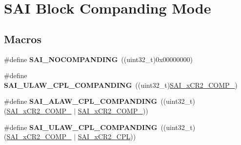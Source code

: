 \hypertarget{group___s_a_i___block___companding___mode}{}\section{S\+AI Block Companding Mode}
\label{group___s_a_i___block___companding___mode}
\subsection*{Macros}
\begin{DoxyCompactItemize}
\item 
\#define {\bfseries S\+A\+I\+\_\+\+N\+O\+C\+O\+M\+P\+A\+N\+D\+I\+NG}~((uint32\+\_\+t)0x00000000)\hypertarget{group___s_a_i___block___companding___mode_ga3c68168cebaf9498e3a46c3d68b7407d}{}\label{group___s_a_i___block___companding___mode_ga3c68168cebaf9498e3a46c3d68b7407d}

\item 
\#define {\bfseries S\+A\+I\+\_\+\+U\+L\+A\+W\+\_\+C\+P\+L\+\_\+\+C\+O\+M\+P\+A\+N\+D\+I\+NG}~((uint32\+\_\+t)\hyperlink{group___peripheral___registers___bits___definition_ga07d441ea4c041f91e4879a5b32278128}{S\+A\+I\+\_\+x\+C\+R2\+\_\+\+C\+O\+M\+P\+\_})\hypertarget{group___s_a_i___block___companding___mode_ga34b57f1a84cea0882f4af819cb160675}{}\label{group___s_a_i___block___companding___mode_ga34b57f1a84cea0882f4af819cb160675}

\item 
\#define {\bfseries S\+A\+I\+\_\+\+A\+L\+A\+W\+\_\+C\+P\+L\+\_\+\+C\+O\+M\+P\+A\+N\+D\+I\+NG}~((uint32\+\_\+t)(\hyperlink{group___peripheral___registers___bits___definition_ga07d441ea4c041f91e4879a5b32278128}{S\+A\+I\+\_\+x\+C\+R2\+\_\+\+C\+O\+M\+P\+\_} $\vert$ \hyperlink{group___peripheral___registers___bits___definition_ga4e73ed73e3404aa41ae0edad8af036f8}{S\+A\+I\+\_\+x\+C\+R2\+\_\+\+C\+O\+M\+P\+\_}))\hypertarget{group___s_a_i___block___companding___mode_gadd2d22be92ae572c749d709c14e7e4c1}{}\label{group___s_a_i___block___companding___mode_gadd2d22be92ae572c749d709c14e7e4c1}

\item 
\#define {\bfseries S\+A\+I\+\_\+\+U\+L\+A\+W\+\_\+C\+P\+L\+\_\+\+C\+O\+M\+P\+A\+N\+D\+I\+NG}~((uint32\+\_\+t)(\hyperlink{group___peripheral___registers___bits___definition_ga07d441ea4c041f91e4879a5b32278128}{S\+A\+I\+\_\+x\+C\+R2\+\_\+\+C\+O\+M\+P\+\_} $\vert$ \hyperlink{group___peripheral___registers___bits___definition_ga3a8f6db7fd5fe5f0e264fa6c184d02e1}{S\+A\+I\+\_\+x\+C\+R2\+\_\+\+C\+PL}))\hypertarget{group___s_a_i___block___companding___mode_ga0d1e7bb12af897862bd21cb38a4360c0}{}\label{group___s_a_i___block___companding___mode_ga0d1e7bb12af897862bd21cb38a4360c0}


\end{DoxyCompactItemize}

